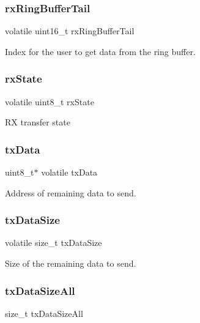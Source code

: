\subsubsection{\texorpdfstring{rxRingBufferTail}{rxRingBufferTail}}
{\footnotesize\ttfamily volatile uint16\+\_\+t rx\+Ring\+Buffer\+Tail}

Index for the user to get data from the ring buffer. \mbox{\label{struct__uart__handle_a6f289c8f3bd5e967fb808de6da7f1c0c}} 
\subsubsection{\texorpdfstring{rxState}{rxState}}
{\footnotesize\ttfamily volatile uint8\+\_\+t rx\+State}

RX transfer state \mbox{\label{struct__uart__handle_ab56d8f300582ce9d7f4a79729124739d}} 
\subsubsection{\texorpdfstring{txData}{txData}}
{\footnotesize\ttfamily uint8\+\_\+t$\ast$ volatile tx\+Data}

Address of remaining data to send. \mbox{\label{struct__uart__handle_a1f9d0ac47a5cdabb34988d5d811aceaf}} 
\subsubsection{\texorpdfstring{txDataSize}{txDataSize}}
{\footnotesize\ttfamily volatile size\+\_\+t tx\+Data\+Size}

Size of the remaining data to send. \mbox{\label{struct__uart__handle_a733be3042be24bb3eb6f0c6a82d28862}} 
\subsubsection{\texorpdfstring{txDataSizeAll}{txDataSizeAll}}
{\footnotesize\ttfamily size\+\_\+t tx\+Data\+Size\+All}

